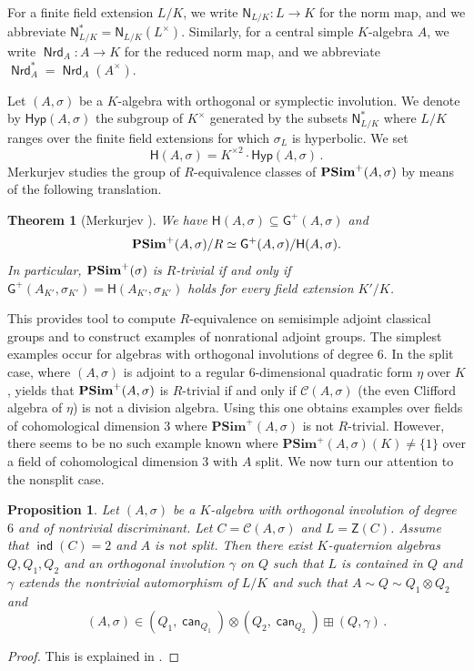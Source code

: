 \documentclass[twoside,11pt]{amsart}
\numberwithin{equation}{section}
\newtheorem{thm}[equation]{Theorem}
\newtheorem{prop}[equation]{Proposition}
\theoremstyle{definition}
\newcommand\ind{\operatorname{\mathsf{ind}}}
\newcommand\Nrd{\operatorname{\mathsf{Nrd}}}
\newcommand\N{\operatorname{N}}
\newcommand{\can}{\operatorname{\mathsf{can}}}
\newcommand{\mg}[1]{{#1}^{\times}}
\newcommand{\sq}[1]{{#1}^{\times 2}}
\newcommand{\s}{\sigma}
\newcommand{\mc}{\mathcal}
\renewcommand{\N}{\mathsf{N}}
\newcommand{\G}{\mathsf{G}}
\renewcommand{\H}{\mathsf{H}}
\newcommand{\Z}{\mathsf{Z}}
\newcommand{\Hyp}{\mathsf{Hyp}}
\newcommand{\Cl}{\mc{C}}
\begin{document}
For a finite field extension $L/K$, we write 
$\N_{L/K}:L\to K$ for the norm map, and we abbreviate $\N_{L/K}^\ast=\N_{L/K}(\mg{L})$.
Similarly, for a central simple $K$-algebra $A$, we write 
$\Nrd_A:A\to K$ for the reduced norm map, and we abbreviate $\Nrd_A^\ast=\Nrd_A(\mg{A})$.

Let $(A,\s)$ be a $K$-algebra with orthogonal or symplectic involution.
We denote by $\Hyp(A,\s)$ the subgroup of $\mg{K}$ generated by the subsets $\N^\ast_{L/K}$ where $L/K$ ranges over the finite field extensions for which $\s_{L}$ is hyperbolic.
We set $$\H(A,\s)=\sq{K}\cdot\Hyp(A,\s)\,.$$
Merkurjev studies the 
group of $R$-equivalence classes of  
${\bf PSim}^+ (A, \sigma)$ by means of the following translation.

\begin{thm}[Merkurjev \hbox{\cite[Theorem 1]{Mer96}}]
\label{Mer:T1}
We have $\H(A,\sigma)\subseteq\G^+(A,\sigma)$ and
$$ 
{\bf PSim}^+(A,\sigma)/R \simeq  
\G^+(A,\sigma)/\H(A,\sigma).  
$$ 
In particular, ${\bf PSim}^+(\s)$ is $R$-trivial if and only if $\G^+(A_{K'},\s_{K'})=\H(A_{K'},\s_{K'})$ holds for every field extension $K'/K$.
\end{thm}


This provides tool to compute $R$-equivalence on semisimple adjoint classical groups and to construct examples of nonrational adjoint groups. 
The simplest examples occur for algebras with orthogonal involutions of degree $6$.
In the split case, where $(A,\s)$ is adjoint to a regular $6$-dimensional quadratic form $\eta$ over $K$, \cite[Theorem 2]{Mer96} yields that ${\bf PSim}^+(A,\s)$ is $R$-trivial if and only if $\mc{C}(A,\s)$ (the even Clifford algebra of $\eta$) is not a division algebra.
Using this one obtains examples over fields of cohomological dimension $3$ where $\mathbf{PSim}^+(A,\s)$ is not $R$-trivial.
However, there seems to be no such example known where $\mathbf{PSim}^+(A,\s)(K)\neq \{1\}$ over a field of cohomological dimension $3$ with $A$ split.
We now turn our attention to the nonsplit case.

\begin{prop}\label{D3-ex-construction}
Let $(A,\s)$ be a $K$-algebra with orthogonal involution of degree $6$ and of nontrivial discriminant. Let $C=\Cl(A,\s)$ and $L=\Z(C)$. Assume that $\ind(C)=2$ and $A$ is not split. 
Then there exist $K$-quaternion algebras $Q,Q_1,Q_2$ and an orthogonal involution $\gamma$ on $Q$ such that $L$ is contained in $Q$ and $\gamma$ extends the nontrivial automorphism of $L/K$ and such that $A\sim Q\sim Q_1\otimes Q_2$ and $$(A,\s) \in (Q_1,\can_{Q_1})\otimes (Q_2,\can_{Q_2}) \boxplus (Q,\gamma)\,.$$
\end{prop}
\begin{proof}
    This is explained in \cite[p.~207-208]{Mer96}.
\end{proof}
\end{document}
